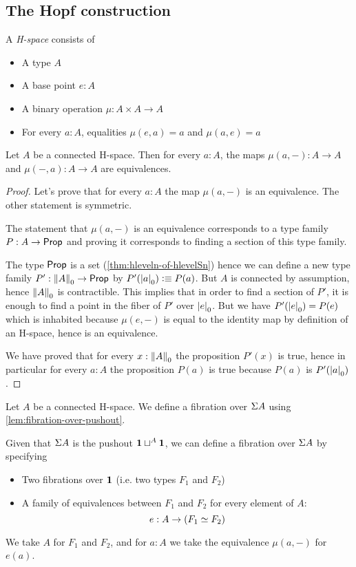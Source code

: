 \subsection{The Hopf construction}

\begin{defn}
  A \emph{H-space} consists of
  \begin{itemize}
  \item A type $A$
  \item A base point $e:A$
  \item A binary operation $\mu:A\times A\to A$
  \item For every $a:A$, equalities $\mu(e,a)=a$ and $\mu(a,e)=a$
  \end{itemize}
\end{defn}

\begin{lem}
  Let $A$ be a connected H-space. Then for every $a:A$, the maps $\mu(a,-):A\to
  A$ and $\mu(-,a):A\to A$ are equivalences.
\end{lem}
\begin{proof}
  Let’s prove that for every $a:A$ the map $\mu(a,-)$ is an equivalence. The
  other statement is symmetric.

  The statement that $\mu(a,-)$ is an equivalence corresponds to a type family
  $P:A\to\prop$ and proving it corresponds to finding a section of this type
  family.

  The type $\prop$ is a set (\autoref{thm:hleveln-of-hlevelSn}) hence we can
  define a new type family $P':\trunc0A\to\prop$ by $P'(\tproj0a)\defeq
  P(a)$. But $A$ is connected by assumption, hence $\trunc0A$ is
  contractible. This implies that in order to find a section of $P'$, it is
  enough to find a point in the fiber of $P'$ over $\tproj0e$. But we have
  $P'(\tproj0e)=P(e)$ which is inhabited because $\mu(e,-)$ is equal to the
  identity map by definition of an H-space, hence is an equivalence.

  We have proved that for every $x:\trunc0A$ the proposition $P'(x)$ is true,
  hence in particular for every $a:A$ the proposition $P(a)$ is true because
  $P(a)$ is $P'(\tproj0a)$.
\end{proof}

\begin{defn}
  Let $A$ be a connected H-space. We define a fibration over $\susp A$ using
  \autoref{lem:fibration-over-pushout}.

  Given that $\susp A$ is the pushout $\unit\sqcup^A\unit$, we can define a
  fibration over $\susp A$ by specifying
  \begin{itemize}
  \item Two fibrations over $\unit$ (i.e. two types $F_1$ and $F_2$)
  \item A family of equivalences between $F_1$ and $F_2$ for every element of
    $A$:
    \[e:A\to(\eqv{F_1}{F_2})\]
  \end{itemize}

  We take $A$ for $F_1$ and $F_2$, and for $a:A$ we take the equivalence
  $\mu(a,-)$ for $e(a)$.
\end{defn}

